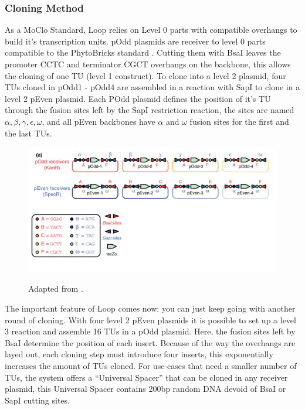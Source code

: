 \subsubsection{Cloning Method}
As a MoClo Standard, Loop relies on Level 0 parts with compatible overhangs to build it’s transcription units. pOdd plasmids are receiver to level 0 parts compatible to the PhytoBricks standard \parencite{Patron2015}. Cutting them with BsaI leaves the promoter CCTC and terminator CGCT overhangs on the backbone, this allows the cloning of one TU (level 1 construct). To clone into a level 2 plasmid, four TUs cloned in pOdd1 - pOdd4 are assembled in a reaction with SapI to clone in a level 2 pEven plasmid. Each POdd plasmid defines the position of it’s TU through the fusion sites left by the SapI restriction reaction, the sites are named $\alpha, \beta, \gamma, \epsilon, \omega$, and all pEven backbones have $\alpha$ and $\omega$ fusion sites for the first and the last TUs. 

\begin{figure}[!htbp]
    \centering
    \caption{Adapted from \parencite{Pollak2020}.}
    \includegraphics[width=\textwidth]{images/chap4/chap4_loop_01.png}
    \label{fig:ch4loop01}
\end{figure}
\FloatBarrier

\noindent
The important feature of Loop comes now: you can just keep going with another round of cloning. With four level 2 pEven plasmids it is possible to set up a level 3 reaction and  assemble 16 TUs in a pOdd plasmid. Here, the fusion sites left by BsaI determine the position of each insert. Because of the way the overhangs are layed out, each cloning step must introduce four inserts, this exponentially increases the amount of TUs cloned. For use-cases that need a smaller number of TUs, the system offers a “Universal Spacer” that can be cloned in any receiver plasmid, this Universal Spacer contains 200bp random DNA devoid of BsaI or SapI cutting sites. 

